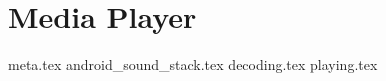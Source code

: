 \chapter{Media Player}\label{cha:media_player}
{meta.tex}
{android_sound_stack.tex}
{decoding.tex}
{playing.tex}

